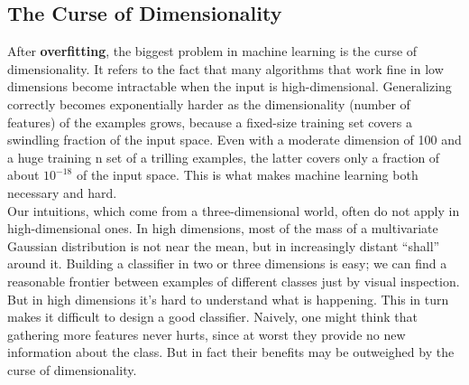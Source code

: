 \documentclass[11pt,a4paper]{report}
\begin{document}
\subsection*{The Curse of Dimensionality}

\noindent After \textbf{overfitting}, the biggest problem in machine
learning is the curse of dimensionality. It refers to the fact that
many algorithms that work fine in low dimensions become intractable
when the input is high-dimensional. Generalizing correctly becomes
exponentially harder as the dimensionality (number of features) of the
examples grows, because a fixed-size training set covers a swindling
fraction of the input space. Even with a moderate dimension of 100 and
a huge training n set of a trilling examples, the latter covers only a
fraction of about $10^{-18}$ of the input space. This is what makes
machine learning both necessary and hard.\\

\noindent Our intuitions, which come from a three-dimensional world,
often do not apply in high-dimensional ones. In high dimensions, most
of the mass of a multivariate Gaussian distribution is not near the
mean, but in increasingly distant ``shall'' around it. Building a
classifier in two or three dimensions is easy; we can find a
reasonable frontier between examples of different classes just by
visual inspection. But in high dimensions it's hard to understand what
is happening. This in turn makes it difficult to design a good
classifier. Naively, one might think that gathering more features
never hurts, since at worst they provide no new information about the
class. But in fact their benefits may be outweighed by the curse of
dimensionality. 
\end{document}
